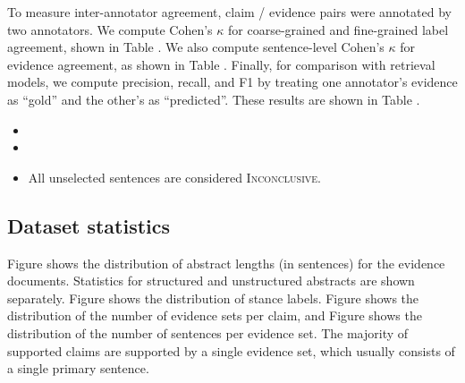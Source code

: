To measure inter-annotator agreement, \todo claim / evidence pairs were annotated by two annotators. We compute Cohen's $\kappa$ for coarse-grained and fine-grained label agreement, shown in Table \todo. We also compute sentence-level Cohen's $\kappa$ for evidence agreement, as shown in Table \todo. Finally, for comparison with retrieval models, we compute precision, recall, and F1 by  treating one  annotator's evidence as ``gold'' and the other's as ``predicted''. These results are shown in Table \todo.


\begin{itemize}
    \item {}
    \item {}
    \item All unselected sentences are considered \textsc{Inconclusive}. 
\end{itemize}



\subsection{Dataset statistics}

Figure \todo shows the distribution of abstract lengths (in sentences) for the evidence documents. Statistics for structured and unstructured abstracts are shown separately. Figure \todo shows the distribution of stance labels. Figure \todo shows the distribution of the number of evidence sets per claim, and Figure \todo shows the distribution of the number of sentences per evidence set. The majority of supported claims are supported by a single evidence set, which usually consists of a single primary sentence.